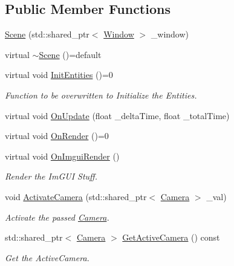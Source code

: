 \subsection*{Public Member Functions}
\begin{DoxyCompactItemize}
\item 
\mbox{\hyperlink{classpiolot_1_1_scene_af42469b97e0c1006bec5d384223db148}{Scene}} (std\+::shared\+\_\+ptr$<$ \mbox{\hyperlink{class_window}{Window}} $>$ \+\_\+window)
\item 
virtual \mbox{\hyperlink{classpiolot_1_1_scene_aab1c2430f0f2317c0ae5b8fa8edc6fff}{$\sim$\+Scene}} ()=default
\item 
virtual void \mbox{\hyperlink{group___virtual_ga6871dbb3f61a724a166fd83c3c1dc3a3}{Init\+Entities}} ()=0
\begin{DoxyCompactList}\small\item\em Function to be overwritten to Initialize the Entities. \end{DoxyCompactList}\item 
virtual void \mbox{\hyperlink{group___virtual_gae05b812e9f1caa80526a79a03ab456e1}{On\+Update}} (float \+\_\+delta\+Time, float \+\_\+total\+Time)
\item 
virtual void \mbox{\hyperlink{group___virtual_gaaa3f6f2cb0dce355d890c8b43a2f11f2}{On\+Render}} ()=0
\item 
virtual void \mbox{\hyperlink{group___virtual_gaedea470f1c3485d76ef0681e4a503584}{On\+Imgui\+Render}} ()
\begin{DoxyCompactList}\small\item\em Render the Im\+G\+UI Stuff. \end{DoxyCompactList}\item 
void \mbox{\hyperlink{classpiolot_1_1_scene_a56d2c68922b38f97554ae4edde21f718}{Activate\+Camera}} (std\+::shared\+\_\+ptr$<$ \mbox{\hyperlink{classpiolot_1_1_camera}{Camera}} $>$ \+\_\+val)
\begin{DoxyCompactList}\small\item\em Activate the passed \mbox{\hyperlink{classpiolot_1_1_camera}{Camera}}. \end{DoxyCompactList}\item 
std\+::shared\+\_\+ptr$<$ \mbox{\hyperlink{classpiolot_1_1_camera}{Camera}} $>$ \mbox{\hyperlink{classpiolot_1_1_scene_ac0d71d1ad7c27872086d9f82ee7be7fb}{Get\+Active\+Camera}} () const
\begin{DoxyCompactList}\small\item\em Get the Active\+Camera. \end{DoxyCompactList}\end{DoxyCompactItemize}
